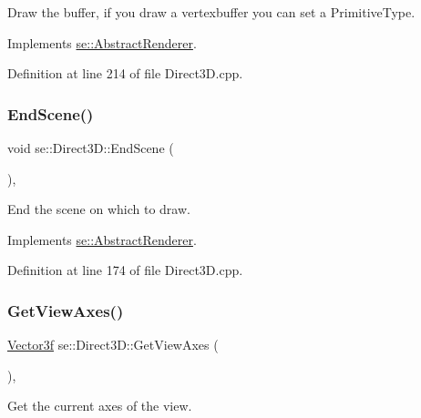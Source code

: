 Draw the buffer, if you draw a vertexbuffer you can set a Primitive\+Type. 

Implements \mbox{\hyperlink{classse_1_1_abstract_renderer_ae743059a7b35a9bc1c9108613b43f42f}{se\+::\+Abstract\+Renderer}}.



Definition at line 214 of file Direct3\+D.\+cpp.

\mbox{\label{classse_1_1_direct3_d_acaa80262dcbd93b7aa03bd61e854b2a2}} 
\subsubsection{\texorpdfstring{End\+Scene()}{EndScene()}}
{\footnotesize\ttfamily void se\+::\+Direct3\+D\+::\+End\+Scene (\begin{DoxyParamCaption}{ }\end{DoxyParamCaption})\hspace{0.3cm}{\ttfamily [override]}, {\ttfamily [virtual]}}

End the scene on which to draw. 

Implements \mbox{\hyperlink{classse_1_1_abstract_renderer_a4329c70d64528cdc5bfcd5e6dee3f2e3}{se\+::\+Abstract\+Renderer}}.



Definition at line 174 of file Direct3\+D.\+cpp.

\mbox{\label{classse_1_1_direct3_d_a74d6926ba18dac6ce23c7dea433de7bd}} 
\subsubsection{\texorpdfstring{Get\+View\+Axes()}{GetViewAxes()}}
{\footnotesize\ttfamily \mbox{\hyperlink{namespacese_a12e07512d95e2fdebdaf74a5ea2cf5f6}{Vector3f}} se\+::\+Direct3\+D\+::\+Get\+View\+Axes (\begin{DoxyParamCaption}{ }\end{DoxyParamCaption})\hspace{0.3cm}{\ttfamily [override]}, {\ttfamily [virtual]}}

Get the current axes of the view. 


